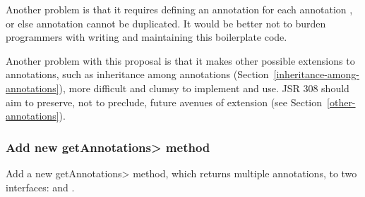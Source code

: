 \documentclass[10pt]{article}
\begin{document}
Another problem is that it requires defining an 
annotation for each annotation , or else annotation 
cannot be duplicated.  It would be better not to burden programmers with
writing and maintaining this boilerplate code.

Another problem with this proposal is that it makes other possible
extensions to annotations, such as inheritance among annotations
(Section~\ref{inheritance-among-annotations}), more difficult and clumsy to
implement and use.  JSR 308 should aim to preserve, not to preclude, future
avenues of extension (see Section~\ref{other-annotations}).


% 
% 
% 
% 
% 
% 
% 
% 
% 
% 
% 
% 
% 
% 


\subsubsection{Add new \<getAnnotations> method\label{duplicate-annotations-getAnnotations}}

Add a new \<getAnnotations> method, which returns multiple annotations,
to two interfaces:  and
.
\end{document}
